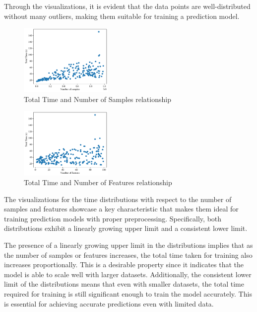 \documentclass[conference]{IEEEtran}
\begin{document}
Through the visualizations, it is evident that the data points are well-distributed without many outliers, making them suitable for training a prediction model.

\begin{figure}[ht]
  \centering
\includegraphics[width=0.4\textwidth]{plots/experiment_results/kmeans_time_samples.pdf}
  \caption{Total Time and Number of Samples relationship}
\end{figure}

\begin{figure}[ht]
    \centering
  \includegraphics[width=0.4\textwidth]{plots/experiment_results/kmeans_time_features.pdf}
    \caption{Total Time and Number of Features relationship}
  \end{figure}

The visualizations for the time distributions with respect to the number of samples and features showcase a key characteristic that makes them ideal for training prediction models with proper preprocessing. Specifically, both distributions exhibit a linearly growing upper limit and a consistent lower limit.

The presence of a linearly growing upper limit in the distributions implies that as the number of samples or features increases, the total time taken for training also increases proportionally. This is a desirable property since it indicates that the model is able to scale well with larger datasets. Additionally, the consistent lower limit of the distributions means that even with smaller datasets, the total time required for training is still significant enough to train the model accurately. This is essential for achieving accurate predictions even with limited data.
\end{document}
